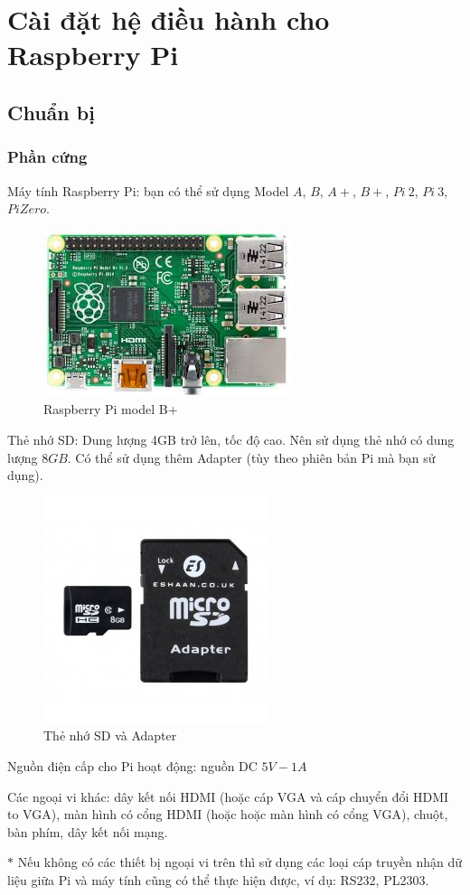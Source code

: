 \chapter{Cài đặt hệ điều hành cho Raspberry Pi}
\section{Chuẩn bị}
\subsection{Phần cứng}
\begin{list}{--}{}
\item Máy tính Raspberry Pi: bạn có thể sử dụng Model $A$, $B$, $A+$, $B+$, $Pi~2$, $Pi~3$, $Pi Zero$.
\begin{figure}[!h]
\begin{center}
\includegraphics[scale=.5]{setup-os/images/Pi-H}
\end{center}
\caption{Raspberry Pi model B+}
\end{figure}
\item Thẻ nhớ SD: Dung lượng 4GB trở lên, tốc độ cao. Nên sử dụng thẻ nhớ có dung lượng $8GB$. Có thể sử dụng thêm Adapter (tùy theo phiên bản Pi mà bạn sử dụng).
\begin{figure}[!h]
\begin{center}
\includegraphics[scale=.4]{setup-os/images/SD-H}
\end{center}
\caption{Thẻ nhớ SD và Adapter}
\end{figure}
\item Nguồn điện cấp cho Pi hoạt động: nguồn DC $5V-1A$
\item Các ngoại vi khác: dây kết nối HDMI (hoặc cáp VGA và cáp chuyển đổi HDMI to VGA), màn hình có cổng HDMI (hoặc hoặc màn hình có cổng VGA), chuột, bàn phím, dây kết nối mạng.
\item[$\ast$] Nếu không có các thiết bị ngoại vi trên thì sử dụng các loại cáp truyền nhận dữ liệu giữa Pi và máy tính cũng có thể thực hiện được, ví dụ: RS232, PL2303.
\end{list}
